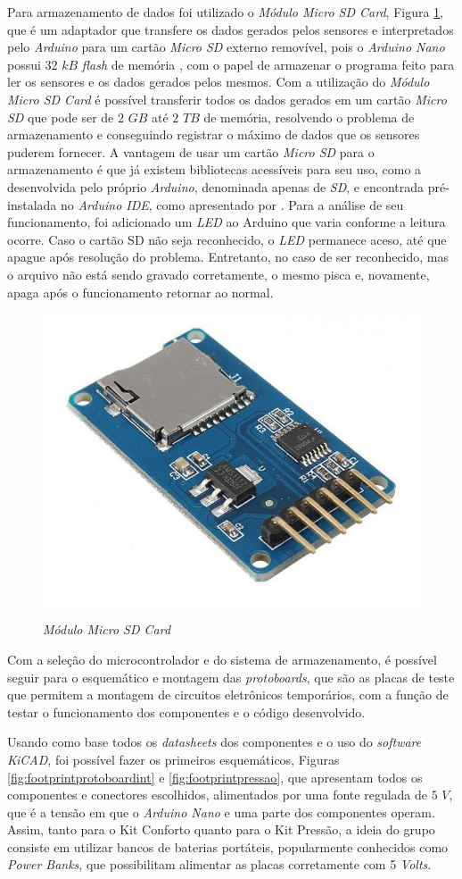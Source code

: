 \documentclass[acronym,symbols,table]{fei}
\begin{document}
Para armazenamento de dados foi utilizado o \textit{Módulo Micro SD Card}, Figura \ref{fig:FotomicroSD}, que é um adaptador que transfere os dados gerados pelos sensores e interpretados pelo \textit{Arduino} para um cartão \textit{Micro SD} externo removível, pois o \textit{Arduino Nano} possui $32$ $kB$ \textit{flash} de memória \cite{UNO}, com o papel de armazenar o programa feito para ler os sensores e os dados gerados pelos mesmos. Com a utilização do \textit{Módulo Micro SD Card} é possível transferir todos os dados gerados em um cartão \textit{Micro SD} que pode ser de $2$ $GB$ até $2$ $TB$ de memória, resolvendo o problema de armazenamento e conseguindo registrar o máximo de dados que os sensores puderem fornecer. A vantagem de usar um cartão \textit{Micro SD} para o armazenamento é que já existem bibliotecas acessíveis para seu uso, como a desenvolvida pelo próprio \textit{Arduino}, denominada apenas de \textit{SD}, e encontrada pré-instalada no \textit{Arduino IDE}, como apresentado por \textcite{ArdMicroSD}. Para a análise de seu funcionamento, foi adicionado um \textit{LED} ao Arduino que varia conforme a leitura ocorre. Caso o cartão SD não seja reconhecido, o \textit{LED} permanece aceso, até que apague após resolução do problema. Entretanto, no caso de ser reconhecido, mas o arquivo não está sendo gravado corretamente, o mesmo pisca e, novamente, apaga após o funcionamento retornar ao normal.

\begin{figure}[!htb]
\centering
    \caption{\textit{Módulo Micro SD Card}}
    \includegraphics[width=0.3\linewidth]{Imagens/microsd.png}
    \label{fig:FotomicroSD}
\end{figure}

Com a seleção do microcontrolador e do sistema de armazenamento, é possível seguir para o esquemático e montagem das \textit{protoboards}, que são as placas de teste que permitem a montagem de circuitos eletrônicos temporários, com a função de testar o funcionamento dos componentes e o código desenvolvido.

Usando como base todos os \textit{datasheets} dos componentes e o uso do \textit{software} \textit{KiCAD}, foi possível fazer os primeiros esquemáticos, Figuras \ref{fig:footprintprotoboardint} e \ref{fig:footprintpressao}, que apresentam todos os componentes e conectores escolhidos, alimentados por uma fonte regulada de $5$ $V$, que é a tensão em que o \textit{Arduino Nano} e uma parte dos componentes operam. Assim, tanto para o Kit Conforto quanto para o Kit Pressão, a ideia do grupo consiste em utilizar bancos de baterias portáteis, popularmente conhecidos como \textit{Power Banks}, que possibilitam alimentar as placas corretamente com 5 \textit{Volts}.
\end{document}
